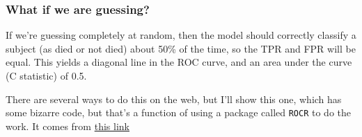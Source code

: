\documentclass[]{book}
\newenvironment{Shaded}{\begin{snugshade}}{\end{snugshade}}
\newcommand{\KeywordTok}[1]{\textcolor[rgb]{0.13,0.29,0.53}{\textbf{#1}}}
\newcommand{\DataTypeTok}[1]{\textcolor[rgb]{0.13,0.29,0.53}{#1}}
\newcommand{\DecValTok}[1]{\textcolor[rgb]{0.00,0.00,0.81}{#1}}
\newcommand{\FloatTok}[1]{\textcolor[rgb]{0.00,0.00,0.81}{#1}}
\newcommand{\StringTok}[1]{\textcolor[rgb]{0.31,0.60,0.02}{#1}}
\newcommand{\OperatorTok}[1]{\textcolor[rgb]{0.81,0.36,0.00}{\textbf{#1}}}
\newcommand{\NormalTok}[1]{#1}
\theoremstyle{definition}
\theoremstyle{definition}
\theoremstyle{definition}
\theoremstyle{remark}
\begin{document}
\begin{Shaded}
\end{Shaded}

\subsubsection{What if we are guessing?}\label{what-if-we-are-guessing}

If we're guessing completely at random, then the model should correctly
classify a subject (as died or not died) about 50\% of the time, so the
TPR and FPR will be equal. This yields a diagonal line in the ROC curve,
and an area under the curve (C statistic) of 0.5.

There are several ways to do this on the web, but I'll show this one,
which has some bizarre code, but that's a function of using a package
called \texttt{ROCR} to do the work. It comes from
\href{http://blog.yhat.com/posts/roc-curves.html}{this link}
\end{document}

